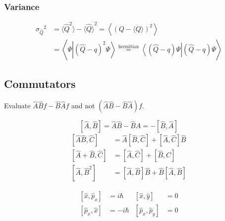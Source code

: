 \subsubsection{Variance}
\noindent\begin{align*}
    {\sigma_{\widehat{Q}}}^2 & = \langle {\widehat{Q}}^2 \rangle - {\langle \widehat{Q} \rangle }^2 =\left\langle{\left(Q-\langle Q\rangle\right)}^{2}\right\rangle                                                               \\
                             & =\left\langle\Psi\left|{\left(\widehat{Q}-q\right)}^{2}\Psi\right\rangle\stackrel{\text{hermitian}}{=}\left\langle\left(\widehat{Q}-q\right)\Psi\right|\left(\widehat{Q}-q\right)\Psi\right\rangle
\end{align*}


\subsection{Commutators}
Evaluate $\widehat{A}\widehat{B}f - \widehat{B}\widehat{A}f$ and not $(\widehat{A}\widehat{B} - \widehat{B}\widehat{A})f$.

\noindent\begin{equation*}
    \left[\widehat{A},\widehat{B}\right] = \widehat{A}\widehat{B} - \widehat{B}\widehat{A} = -\left[\widehat{B},\widehat{A}\right]
\end{equation*}
\noindent\begin{align*}
    \left[\widehat{A}\widehat{B},\widehat{C}\right]  & =\widehat{A}\left[\widehat{B},\widehat{C}\right]+\left[\widehat{A},\widehat{C}\right]\widehat{B}     \\
    \left[\widehat{A}+\widehat{B},\widehat{C}\right] & = \left[\widehat{A},\widehat{C}\right]+\left[\widehat{B},\widehat{C}\right]                          \\
    \left[\widehat{A},\widehat{B}^2\right]           & = \left[\widehat{A},\widehat{B}\right] \widehat{B} + \widehat{B}\left[\widehat{A},\widehat{B}\right]
\end{align*}


\noindent\begin{align*}
    \left[\widehat{x},\widehat{p}_x\right]  & = i\hbar  & \left[\widehat{x}, \widehat{y}\right]     & = 0 \\
    \left[\widehat{p}_x, \widehat{x}\right] & = -i\hbar & \left[\widehat{p}_x, \widehat{p}_y\right] & = 0
\end{align*}

